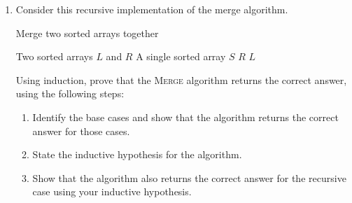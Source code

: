 \begin{exercises}
\begin{enumerate}
        \item[\challenge] Consider this recursive implementation of the merge algorithm.
        \begin{algorithm}[H]
            \caption{Merge two sorted arrays together}
            \begin{algorithmic}[1]
                \Require Two sorted arrays $L$ and $R$
                \Ensure A single sorted array $S$
                        \Return $R$
                        \Return $L$
                    \EndIf
                        \Return {}
                    \Else
                        \Return {}
                    \EndIf
                \EndFunction
            \end{algorithmic}
        \end{algorithm}

        Using induction, prove that the \textsc{Merge} algorithm returns the correct answer, using the following steps:
        \begin{enumerate}
            \item Identify the base cases and show that the algorithm returns the correct answer for those cases.
            \item State the inductive hypothesis for the algorithm.
            \item Show that the algorithm also returns the correct answer for the recursive case using your inductive hypothesis.
        \end{enumerate}

    \end{enumerate}
\end{exercises}
